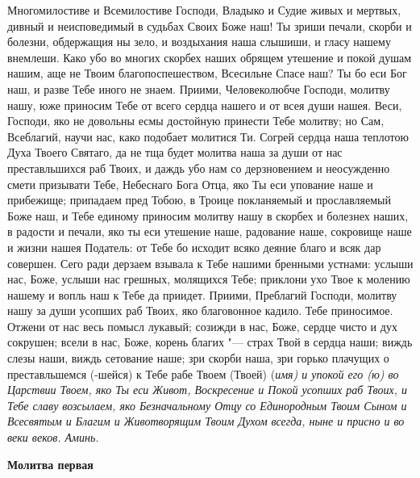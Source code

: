 Многомилостиве и Всемилостиве Господи, Владыко и Судие живых и мертвых, дивный и неисповедимый в судьбах Своих Боже наш! Ты зриши печали, скорби и болезни, обдержащия ны зело, и воздыхания наша слышиши, и гласу нашему внемлеши. Како убо во многих скорбех наших обрящем утешение и покой душам нашим, аще не Твоим благопоспешеством, Всесильне Спасе наш? Ты бо еси Бог наш, и разве Тебе иного не знаем. Приими, Человеколюбче Господи, молитву нашу, юже приносим Тебе от всего сердца нашего и от всея души нашея. Веси, Господи, яко не довольны есмы достойную принести Тебе молитву; но Сам, Всеблагий, научи нас, како подобает молитися Ти. Согрей сердца наша теплотою Духа Твоего Святаго, да не тща будет молитва наша за души от нас преставльшихся раб Твоих, и даждь убо нам со дерзновением и неосужденно смети призывати Тебе, Небеснаго Бога Отца, яко Ты еси упование наше и прибежище; припадаем пред Тобою, в Троице покланяемый и прославляемый Боже наш, и Тебе единому приносим молитву нашу в скорбех и болезнех наших, в радости и печали, яко ты еси утешение наше, радование наше, сокровище наше и жизни нашея Податель: от Тебе бо исходит всяко деяние благо и всяк дар совершен. Сего ради дерзаем взывала к Тебе нашими бренными устнами: услыши нас, Боже, услыши нас грешных, молящихся Тебе; приклони ухо Твое к молению нашему и вопль наш к Тебе да приидет. Приими, Преблагий Господи, молитву нашу за души усопших раб Твоих, яко благовонное кадило. Тебе приносимое. Отжени от нас весь помысл лукавый; созижди в нас, Боже, сердце чисто и дух сокрушен; всели в нас, Боже, корень благих "--- страх Твой в сердца наши; виждь слезы наши, виждь сетование наше; зри скорби наша, зри горько плачущих о преставльшемся (-шейся) к Тебе рабе Твоем (Твоей) (\itshape имя\normalfont{}) и упокой его (ю) во Царствии Твоем, яко Ты еси Живот, Воскресение и Покой усопших раб Твоих, и Тебе славу возсылаем, яко Безначальному Отцу со Единородным Твоим Сыном и Всесвятым и Благим и Животворящим Твоим Духом всегда, ныне и присно и во веки веков. Аминь.


 


\medskip


\mychapterending




\bfseries Молитва первая\normalfont{}


